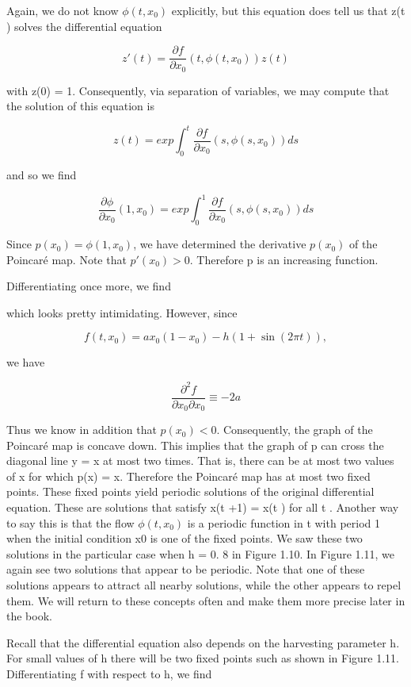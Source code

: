 \documentclass[12pt]{article}
\begin{document}
Again, we do not know $\phi(t, x_0)$ explicitly, but this equation does tell us that
z(t ) solves the differential equation

\[
z'(t) = \frac{\partial f}{\partial x_0}(t , \phi(t, x_0)) z(t)
\]


with z(0) = 1. Consequently, via separation of variables, we may compute
that the solution of this equation is

\[
z(t) = exp \int_0^t \frac{\partial f}{\partial x_0}(s , \phi(s, x_0)) ds
\]

and so we find

\[
\frac{\partial \phi}{\partial x_0}(1, x_0) = exp \int_0^1 \frac{\partial f}{\partial x_0}(s , \phi(s, x_0)) ds
\]

Since $p(x_0) = \phi(1, x_0)$, we have determined the derivative $p(x_0)$ of the
Poincaré map. Note that $p'(x_0) > 0$. Therefore p is an increasing function.

Differentiating once more, we find


which looks pretty intimidating. However, since

\[
f(t, x_0) = ax_0(1 - x_0) - h(1 + \sin (2\pi t)),
\]


we have

\[
\frac{\partial^2 f}{\partial x_0 \partial x_0} \equiv -2a
\]

Thus we know in addition that $p(x_0) < 0$. Consequently, the graph of the
Poincaré map is concave down. This implies that the graph of p can cross the
diagonal line y = x at most two times. That is, there can be at most two values
of x for which p(x) = x. Therefore the Poincaré map has at most two fixed
points. These fixed points yield periodic solutions of the original differential
equation. These are solutions that satisfy x(t +1) = x(t ) for all t . Another way
to say this is that the flow $\phi(t, x_0)$ is a periodic function in t with period 1 when
the initial condition x0 is one of the fixed points. We saw these two solutions
in the particular case when h = 0. 8 in Figure 1.10. In Figure 1.11, we again
see two solutions that appear to be periodic. Note that one of these solutions
appears to attract all nearby solutions, while the other appears to repel them.
We will return to these concepts often and make them more precise later in
the book.

Recall that the differential equation also depends on the harvesting parameter
h. For small values of h there will be two fixed points such as shown in
Figure 1.11. Differentiating f with respect to h, we find
\end{document}
